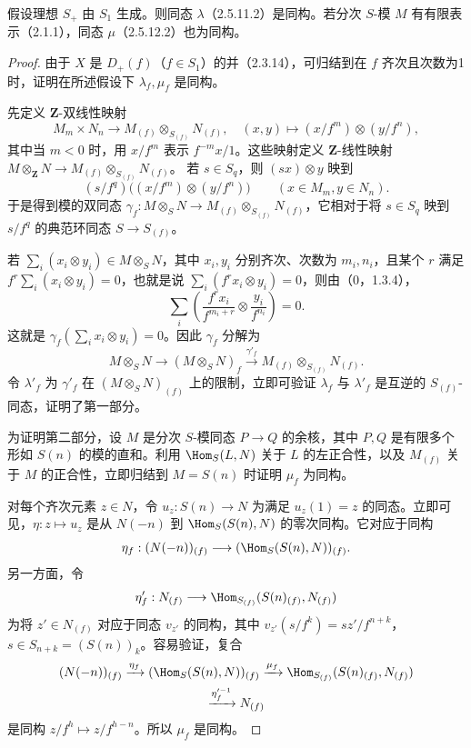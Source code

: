 假设理想 $S_+$ 由 $S_1$ 生成。则同态 $\lambda$（2.5.11.2）是同构。若分次 $S$-模 $M$ 有有限表示（2.1.1），同态 $\mu$（2.5.12.2）也为同构。
\begin{proof}
由于 $X$ 是 $D_+(f)$（$f\in S_1$）的并（2.3.14），可归结到在 $f$ 齐次且次数为1时，证明在所述假设下 $\lambda_f,\mu_f$ 是同构。

先定义 $\mathbf Z$-双线性映射
\[
M_m\times N_n\longrightarrow M_{(f)}\otimes_{S_{(f)}}N_{(f)},
\quad(x,y)\longmapsto(x/f^m)\otimes(y/f^n),
\]
其中当 $m<0$ 时，用 $x/f^m$ 表示 $f^{-m}x/1$。这些映射定义 $\mathbf Z$-线性映射
$M\otimes_{\mathbf Z}N\to M_{(f)}\otimes_{S_{(f)}}N_{(f)}$。
若 $s\in S_q$，则 $(sx)\otimes y$ 映到
\[
(s/f^q)\bigl((x/f^m)\otimes(y/f^n)\bigr)
\qquad(x\in M_m,y\in N_n).
\]
于是得到模的双同态
$\gamma_f:M\otimes_SN\to M_{(f)}\otimes_{S_{(f)}}N_{(f)}$，它相对于将 $s\in S_q$ 映到 $s/f^q$ 的典范环同态 $S\to S_{(f)}$。

若 $\sum_i(x_i\otimes y_i)\in M\otimes_SN$，其中 $x_i,y_i$ 分别齐次、次数为 $m_i,n_i$，且某个 $r$ 满足
$f^r\sum_i(x_i\otimes y_i)=0$，也就是说 $\sum_i(f^rx_i\otimes y_i)=0$，则由（0，1.3.4），
\[
\sum_i\left(\frac{f^rx_i}{f^{m_i+r}}\otimes\frac{y_i}{f^{n_i}}\right)=0.
\]
这就是 $\gamma_f(\sum_i x_i\otimes y_i)=0$。因此 $\gamma_f$ 分解为
\[
M\otimes_SN\longrightarrow(M\otimes_SN)_f
\xrightarrow{\gamma'_f}M_{(f)}\otimes_{S_{(f)}}N_{(f)}.
\]
令 $\lambda'_f$ 为 $\gamma'_f$ 在 $(M\otimes_SN)_{(f)}$ 上的限制，立即可验证 $\lambda_f$ 与 $\lambda'_f$ 是互逆的 $S_{(f)}$-同态，证明了第一部分。

为证明第二部分，设 $M$ 是分次 $S$-模同态 $P\to Q$ 的余核，其中 $P,Q$ 是有限多个形如 $S(n)$ 的模的直和。利用 $\Hom_S(L,N)$ 关于 $L$ 的左正合性，以及 $M_{(f)}$ 关于 $M$ 的正合性，立即归结到 $M=S(n)$ 时证明 $\mu_f$ 为同构。

对每个齐次元素 $z\in N$，令 $u_z:S(n)\to N$ 为满足 $u_z(1)=z$ 的同态。立即可见，$\eta:z\mapsto u_z$ 是从 $N(-n)$ 到 $\Hom_S(S(n),N)$ 的零次同构。它对应于同构
\[
\eta_f:(N(-n))_{(f)}\longrightarrow(\Hom_S(S(n),N))_{(f)}.
\]
另一方面，令
\[
\eta'_f:N_{(f)}\longrightarrow\Hom_{S_{(f)}}(S(n)_{(f)},N_{(f)})
\]
为将 $z'\in N_{(f)}$ 对应于同态 $v_{z'}$ 的同构，其中
$v_{z'}(s/f^k)=sz'/f^{n+k}$，$s\in S_{n+k}=(S(n))_k$。容易验证，复合
\begin{multline*}
(N(-n))_{(f)}\xrightarrow{\eta_f}(\Hom_S(S(n),N))_{(f)}
\xrightarrow{\mu_f}\Hom_{S_{(f)}}(S(n)_{(f)},N_{(f)})\\
\xrightarrow{\eta_f'^{-1}}N_{(f)}
\end{multline*}
是同构 $z/f^h\mapsto z/f^{h-n}$。所以 $\mu_f$ 是同构。
\end{proof}

